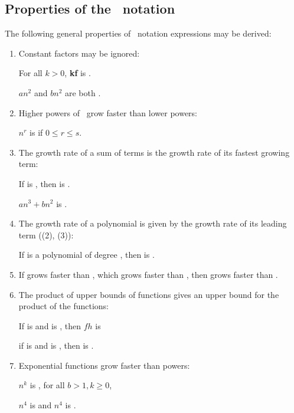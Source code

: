 %
%
%

\subsection{Properties of the \Ohx\ notation}
The following general properties of \Ohx\ notation expressions may
be derived:
\begin{enumerate}
\item Constant factors may be ignored:

For all $k > 0$, {\bf kf} is .

\EG $a n^2$ and $b n^2$ are both .


\item Higher powers of \nx\ grow faster than lower powers:
\label{higher}

$n^r$ is  if $0 \leq r \leq s$.

\item The growth rate of a sum of terms is the growth rate of its
fastest growing term:
\label{sum}

If  is , then  is .

\EG $an^3 + bn^2$ is .

\item The growth rate of a polynomial is given by the growth
rate of its leading term (\CF (2), (3)):

If  is a polynomial of degree ,
then  is .

\item If  grows faster than , which grows faster
than , then  grows faster than .

\item The product of upper bounds of functions gives an upper
bound for the product of the functions:

If  is  and  is , then
$fh$ is 

\EG if  is  and  is ,
then  is .

\item Exponential functions grow faster than powers:

$n^k$ is , for all $b > 1, k \geq 0$,

\EG $n^4$ is  and
$n^4$ is .


\end{enumerate}
